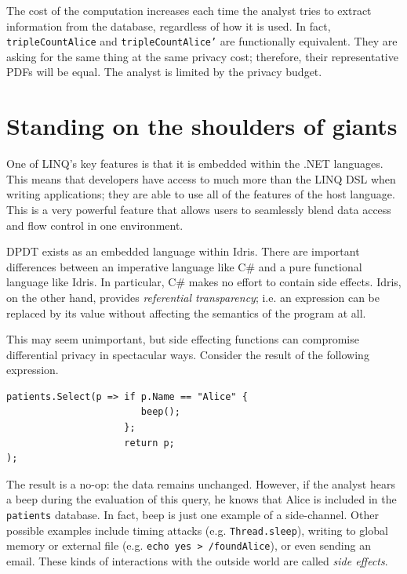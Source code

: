 \documentclass[12pt]{report}
\begin{document}
The cost of the computation increases each time the analyst tries to extract information from the database, regardless of how it is used.
In fact, \texttt{tripleCountAlice} and \texttt{tripleCountAlice'} are functionally equivalent.
They are asking for the same thing at the same privacy cost; therefore, their representative PDFs will be equal.
The analyst is limited by the privacy budget.

\section{Standing on the shoulders of giants}

One of LINQ's key features is that it is embedded within the .NET languages.
This means that developers have access to much more than the LINQ DSL when writing applications; they are able to use all of the features of the host language.
This is a very powerful feature that allows users to seamlessly blend data access and flow control in one environment.

DPDT exists as an embedded language within Idris.
There are important differences between an imperative language like C\# and a pure functional language like Idris.
In particular, C\# makes no effort to contain side effects.
Idris, on the other hand, provides \textit{referential transparency}; i.e. an expression can be replaced by its value without affecting the semantics of the program at all.

This may seem unimportant, but side effecting functions can compromise differential privacy in spectacular ways.
Consider the result of the following expression.

\begin{lstlisting}[caption={Example side-channel attack}]
patients.Select(p => if p.Name == "Alice" {
                        beep();
                     };
                     return p;
);
\end{lstlisting}

The result is a no-op: the data remains unchanged.
However, if the analyst hears a beep during the evaluation of this query, he knows that Alice is included in the \texttt{patients} database.
In fact, beep is just one example of a side-channel.
Other possible examples include timing attacks (e.g. \texttt{Thread.sleep}), writing to global memory or external file (e.g. \texttt{echo yes > /foundAlice}), or even sending an email.
These kinds of interactions with the outside world are called \textit{side effects}.
\end{document}
